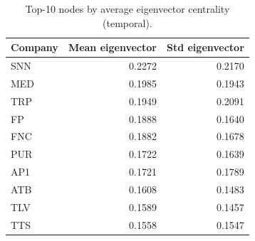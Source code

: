 \begin{table}[ht]
\centering
\small
\begin{tabular}{l r r}
\hline
Company & Mean eigenvector & Std eigenvector \\
\hline
SNN & 0.2272 & 0.2170 \\
MED & 0.1985 & 0.1943 \\
TRP & 0.1949 & 0.2091 \\
FP & 0.1888 & 0.1640 \\
FNC & 0.1882 & 0.1678 \\
PUR & 0.1722 & 0.1639 \\
AP1 & 0.1721 & 0.1789 \\
ATB & 0.1608 & 0.1483 \\
TLV & 0.1589 & 0.1457 \\
TTS & 0.1558 & 0.1547 \\
\hline
\end{tabular}
\caption{Top-10 nodes by average eigenvector centrality (temporal).}
\label{tab:centrality_top10}
\end{table}
